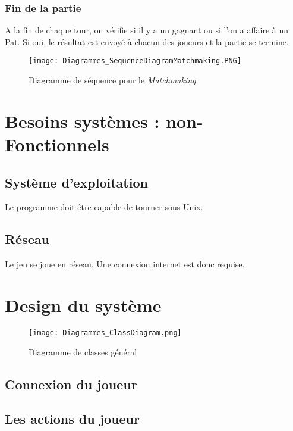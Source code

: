 \documentclass[10pt, a4paper]{article}
\begin{document}
\subsubsection{Fin de la partie}
A la fin de chaque tour, on vérifie si il y a un gagnant ou si l'on a affaire à un Pat. Si oui, le résultat est envoyé à chacun des joueurs et la partie se termine.

		
\label{matchmaker}
		
\begin{figure}[ht]
\centering
\texttt{[image: Diagrammes\_SequenceDiagramMatchmaking.PNG]}
\caption{Diagramme de séquence pour le \textit{Matchmaking}}
\label{SD_matchmaker} %
\end{figure}

\section{Besoins systèmes : non-Fonctionnels}

\subsection{Système d'exploitation}
Le programme doit être capable de tourner sous Unix. \\

\subsection{Réseau}
Le jeu se joue en réseau. Une connexion internet est donc requise. \\

\section{Design du système}
	
\begin{figure}
\texttt{[image: Diagrammes\_ClassDiagram.png]}
\caption{Diagramme de classes général}
\label{CD} %
\end{figure}
		
\subsection{Connexion du joueur}
		
\subsection{Les actions du joueur}
\end{document}
